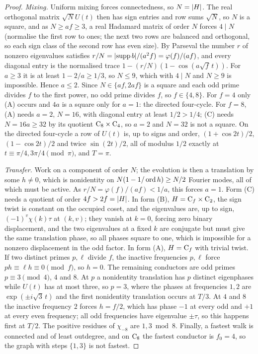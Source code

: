 \begin{proof}
\emph{Mixing.} Uniform mixing forces connectedness, so $N=\lvert H\rvert$. The
real orthogonal matrix $\sqrt NU(t)$ then has sign entries and row sums
$\sqrt N$, so $N$ is a square, and as $N\ge af\ge3$, a real Hadamard
matrix of order $N$ forces $4\mid N$ (normalise the first row to ones;
the next two rows are balanced and orthogonal, so each sign class of the
second row has even size). By Parseval the number $r$ of nonzero
eigenvalues satisfies $r/N=\lvert\operatorname{supp} b\rvert/(a^2f)=\varphi(f)/(af)$, and every
diagonal entry is the normalised trace $1-(r/N)(1-\cos(a\sqrt f\,t))$.
For $a\ge3$ it is at least $1-2/a\ge1/3$, so $N\le9$, which with $4\mid N$
and $N\ge9$ is impossible. Hence $a\le2$. Since $N\in\{af,2af\}$ is a
square and each odd prime divides $f$ to the first power, no odd prime
divides $f$, so $f\in\{4,8\}$. For $f=4$ only (A) occurs and $4a$ is a
square only for $a=1$: the directed four-cycle. For $f=8$, (A) needs
$a=2$, $N=16$, with diagonal entry at least $1/2>1/4$; (C) needs
$N=16a\ge32$ by its quotient $\mathrm{C}_8\times\mathrm{C}_4$, so $a=2$ and
$N=32$ is not a square. On the directed four-cycle a row of $U(t)$ is, up
to signs and order, $(1+\cos2t)/2$, $(1-\cos2t)/2$ and twice $\sin(2t)/2$,
all of modulus $1/2$ exactly at $t\equiv\pi/4,3\pi/4\pmod\pi$, and $T=\pi$.

\emph{Transfer.} Work on a component of order $N$; the evolution is then
a translation by some $h\ne0$, which is nonidentity on
$N(1-1/\operatorname{ord} h)\ge N/2$ Fourier modes, all of which must be active. As
$r/N=\varphi(f)/(af)<1/a$, this forces $a=1$. Form (C) needs a quotient of
order $4f>2f=\lvert H\rvert$. In form (B), $H=\mathrm{C}_f\times\mathrm{C}_2$, the sign
twist is constant on the occupied coset, and the eigenvalues are, up to
sign, $(-1)^v\chi(k)\tau$ at $(k,v)$; they vanish at $k=0$, forcing zero
binary displacement, and the two eigenvalues at a fixed $k$ are conjugate
but must give the same translation phase, so all phases square to one,
which is impossible for a nonzero displacement in the odd factor. In form
(A), $H=\mathrm{C}_f$ with trivial twist. If two distinct primes $p,\ell$
divide $f$, the inactive frequencies $p,\ell$ force $ph\equiv\ell h\equiv0
\pmod f$, so $h=0$. The remaining conductors are odd primes $p\equiv3
\pmod4$, $4$ and $8$. At $p$ a nonidentity translation has $p$ distinct
eigenphases while $U(t)$ has at most three, so $p=3$, where the phases at
frequencies $1,2$ are $\exp(\pm i\sqrt3\,t)$ and the first nonidentity
translation occurs at $T/3$. At $4$ and $8$ the inactive frequency $2$
forces $h=f/2$, which has phase $-1$ at every odd and $+1$ at every even
frequency; all odd frequencies have eigenvalue $\pm\tau$, so this happens
first at $T/2$. The positive residues of $\chi_{-8}$ are $1,3\bmod 8$.
Finally, a fastest walk is connected and of least outdegree, and on
$\mathrm{C}_8$ the fastest conductor is $f_0=4$, so the graph with steps
$\{1,3\}$ is not fastest.
\end{proof}


